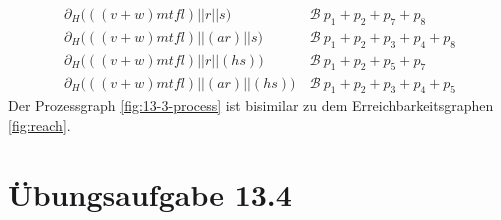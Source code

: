 \documentclass[a4paper]{scrartcl}
\begin{document}
\begin{enumerate}
\begin{equation}
\begin{split}
                \partial_H \Big( ((v + w)mtfl) || r || s \Big) \ &\mathcal{B}\  p_1 + p_2 + p_7 + p_8 \\
                \partial_H \Big( ((v + w)mtfl) || (ar) || s \Big) \ &\mathcal{B}\  p_1 + p_2 + p_3 + p_4 + p_8 \\
                \partial_H \Big( ((v + w)mtfl) || r || (hs) \Big) \ &\mathcal{B}\  p_1 + p_2 + p_5 + p_7 \\
                \partial_H \Big( ((v + w)mtfl) || (ar) || (hs) \Big) \ &\mathcal{B}\  p_1 + p_2 + p_3 + p_4 + p_5
            \end{split}
        \end{equation}
        Der Prozessgraph \ref{fig:13-3-process} ist bisimilar zu dem
        Erreichbarkeitsgraphen \ref{fig:reach}.

\end{enumerate}

\section*{Übungsaufgabe 13.4} 
\end{document}
